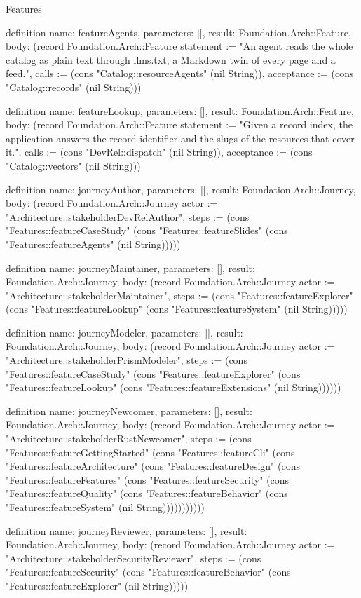 \begin{lexlean}{Features}
\begin{semanticmodule}
definition{
  name: featureAgents,
  parameters: [],
  result: Foundation.Arch::Feature,
  body: (record Foundation.Arch::Feature {statement := "An agent reads the whole catalog as plain text through llms.txt, a Markdown twin of every page and a feed.", calls := (cons "Catalog::resourceAgents" (nil String)), acceptance := (cons "Catalog::records" (nil String))})
}

definition{
  name: featureLookup,
  parameters: [],
  result: Foundation.Arch::Feature,
  body: (record Foundation.Arch::Feature {statement := "Given a record index, the application answers the record identifier and the slugs of the resources that cover it.", calls := (cons "DevRel::dispatch" (nil String)), acceptance := (cons "Catalog::vectors" (nil String))})
}

definition{
  name: journeyAuthor,
  parameters: [],
  result: Foundation.Arch::Journey,
  body: (record Foundation.Arch::Journey {actor := "Architecture::stakeholderDevRelAuthor", steps := (cons "Features::featureCaseStudy" (cons "Features::featureSlides" (cons "Features::featureAgents" (nil String))))})
}

definition{
  name: journeyMaintainer,
  parameters: [],
  result: Foundation.Arch::Journey,
  body: (record Foundation.Arch::Journey {actor := "Architecture::stakeholderMaintainer", steps := (cons "Features::featureExplorer" (cons "Features::featureLookup" (cons "Features::featureSystem" (nil String))))})
}

definition{
  name: journeyModeler,
  parameters: [],
  result: Foundation.Arch::Journey,
  body: (record Foundation.Arch::Journey {actor := "Architecture::stakeholderPrismModeler", steps := (cons "Features::featureCaseStudy" (cons "Features::featureExplorer" (cons "Features::featureLookup" (cons "Features::featureExtensions" (nil String)))))})
}

definition{
  name: journeyNewcomer,
  parameters: [],
  result: Foundation.Arch::Journey,
  body: (record Foundation.Arch::Journey {actor := "Architecture::stakeholderRustNewcomer", steps := (cons "Features::featureGettingStarted" (cons "Features::featureCli" (cons "Features::featureArchitecture" (cons "Features::featureDesign" (cons "Features::featureFeatures" (cons "Features::featureSecurity" (cons "Features::featureQuality" (cons "Features::featureBehavior" (cons "Features::featureSystem" (nil String))))))))))})
}

definition{
  name: journeyReviewer,
  parameters: [],
  result: Foundation.Arch::Journey,
  body: (record Foundation.Arch::Journey {actor := "Architecture::stakeholderSecurityReviewer", steps := (cons "Features::featureSecurity" (cons "Features::featureBehavior" (cons "Features::featureExplorer" (nil String))))})
}
\end{semanticmodule}
\end{lexlean}
